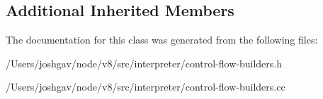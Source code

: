 \subsection*{Additional Inherited Members}


The documentation for this class was generated from the following files\+:\begin{DoxyCompactItemize}
\item 
/\+Users/joshgav/node/v8/src/interpreter/control-\/flow-\/builders.\+h\item 
/\+Users/joshgav/node/v8/src/interpreter/control-\/flow-\/builders.\+cc\end{DoxyCompactItemize}
